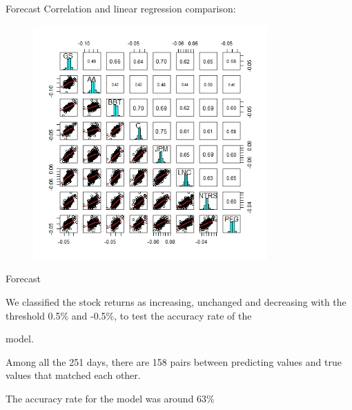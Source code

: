 \documentclass{beamer}
\begin{document}
\begin{frame}

\begin{block}{Forecast}
Correlation and linear regression comparison:
\begin{figure}
     \includegraphics[width=0.8\textwidth, height=0.8\textheight]{gspairs.jpeg}
    \end{figure}

\end{block}


\end{frame}

\begin{frame}

\begin{block}{Forecast}

We classified the stock returns as increasing, unchanged and decreasing with the threshold 0.5\% and -0.5\%, to test the accuracy rate of the

model.

Among all the 251 days, there are 158 pairs between predicting values and true values that matched each other.

The accuracy rate for the model was around 63\%


\end{block}

\end{frame}
\end{document}
